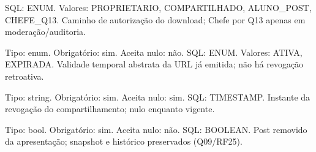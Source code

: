 \begin{description}
SQL: ENUM.
Valores: PROPRIETARIO, COMPARTILHADO, ALUNO\_POST, CHEFE\_Q13.
Caminho de autorização do download; Chefe por Q13 apenas em moderação/auditoria.
\item[validade\_url] Tipo: enum. Obrigatório: sim. Aceita nulo: não.
SQL: ENUM.
Valores: ATIVA, EXPIRADA.
Validade temporal abstrata da URL já emitida; não há revogação retroativa.
\item[revogado\_em] Tipo: string. Obrigatório: sim. Aceita nulo: sim.
SQL: TIMESTAMP.
Instante da revogação do compartilhamento; nulo enquanto vigente.
\item[removido\_da\_apresentacao] Tipo: bool. Obrigatório: sim. Aceita nulo: não.
SQL: BOOLEAN.
Post removido da apresentação; snapshot e histórico preservados (Q09/RF25).
\end{description}
